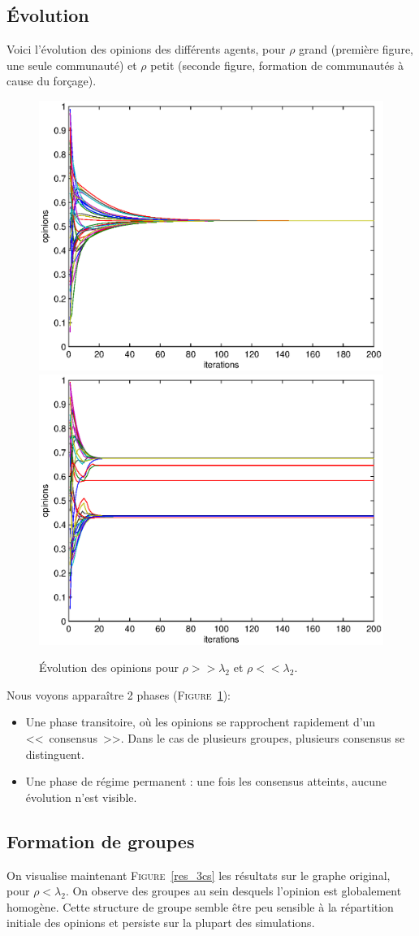 \documentclass[12pt]{article}
\newcommand{\fig}[1]{\textsc{Figure}~\ref{#1}}
\begin{document}
\subsection{Évolution}

Voici l'évolution des opinions des différents agents, pour $\rho$
grand (première figure, une seule communauté) et $\rho$ petit (seconde
figure, formation de communautés à cause du forçage).

\begin{figure}[htb]
	\begin{center}
		\includegraphics[width=.4\textwidth]{evolution_ok}
		\includegraphics[width=.4\textwidth]{evolution_clusters}
	\end{center}
	\caption{Évolution des opinions pour $\rho >> \lambda_2$ et $\rho << \lambda_2$.}
	\label{fig:evol}
\end{figure}

Nous voyons apparaître 2 phases (\fig{fig:evol}):
\begin{itemize}
	\item Une phase transitoire, où les opinions se rapprochent rapidement d'un <<~consensus~>>.
		Dans le cas de plusieurs groupes, plusieurs consensus se distinguent.
	\item Une phase de régime permanent : une fois les consensus atteints, aucune évolution n'est visible.
\end{itemize}


\subsection{Formation de groupes}
On visualise maintenant \fig{res_3cs} les résultats sur le graphe original, pour
$\rho < \lambda_2$. On observe des groupes au sein desquels l'opinion
est globalement homogène. Cette structure de groupe semble être peu
sensible à la répartition initiale des opinions et persiste
sur la plupart des simulations.
\end{document}
